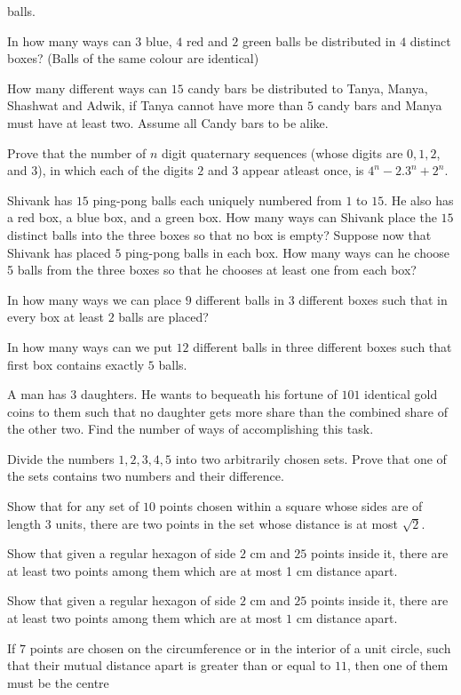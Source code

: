   balls.
\item In how many ways can $3$ blue, $4$ red and $2$ green balls be distributed in $4$ distinct boxes?
  (Balls of the same colour are identical)
\item How many different ways can $15$ candy bars be distributed to Tanya, Manya, Shashwat and Adwik, if
  Tanya cannot have more than $5$ candy bars and Manya must have at least two. Assume all Candy bars to be
  alike.
\item Prove that the number of $n$ digit quaternary sequences (whose digits are $0, 1, 2$, and $3$), in
  which each of the digits $2$ and $3$ appear atleast once, is $4^n - 2.3^n + 2^n$.
\item Shivank has $15$ ping-pong balls each uniquely numbered from $1$ to $15$. He also has a red box, a
  blue box, and a green box. How many ways can Shivank place the $15$ distinct balls into the three boxes
  so that no box is empty? Suppose now that Shivank has placed $5$ ping-pong balls in each box. How many
  ways can he choose 5 balls from the three boxes so that he chooses at least one from each box?
\item In how many ways we can place $9$ different balls in 3 different boxes such that in every box at least
  $2$ balls are placed?
\item In how many ways can we put $12$ different balls in three different boxes such that first box contains
  exactly $5$ balls.
\item A man has $3$ daughters. He wants to bequeath his fortune of $101$ identical gold coins to them such
  that no daughter gets more share than the combined share of the other two. Find the number of ways of
  accomplishing this task.
\item Divide the numbers $1, 2, 3, 4, 5$ into two arbitrarily chosen sets. Prove that one of the sets
  contains two numbers and their difference.
\item Show that for any set of $10$ points chosen within a square whose sides are of length $3$ units, there
  are two points in the set whose distance is at most $\sqrt{2}$.
\item Show that given a regular hexagon of side $2$ cm and $25$ points inside it, there are at least two
  points among them which are at most 1 cm distance apart.
\item Show that given a regular hexagon of side $2$ cm and $25$ points inside it, there are at least two
  points among them which are at most $1$ cm distance apart.
\item If $7$ points are chosen on the circumference or in the interior of a unit circle, such that their
  mutual distance apart is greater than or equal to $11$, then one of them must be the centre
\stopitemize
